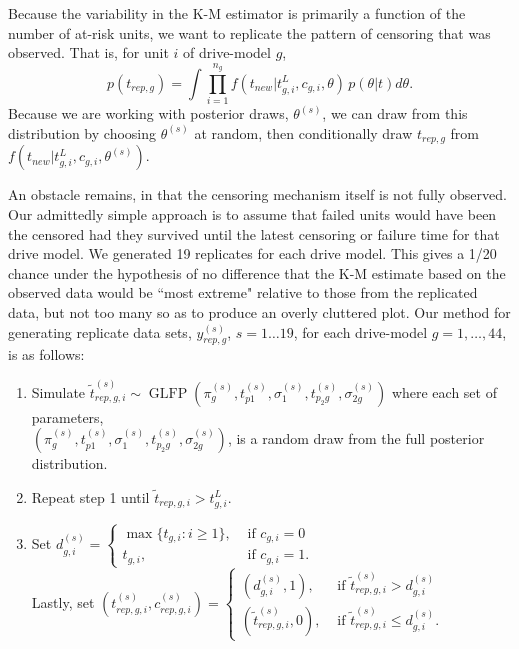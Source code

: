 \documentclass[aoas]{imsart}
\newcommand{\op}{\operatorname}
\begin{document}
Because the variability in the K-M estimator is primarily a function of the number of at-risk units, we want to replicate the pattern of censoring that was observed. That is, for unit $i$ of drive-model $g$,
$$p(t_{rep,g}) = \int \prod_{i=1}^{n_g}f(t_{new}|t_{g,i}^L,c_{g,i},\theta)\,p(\theta|t)d\theta.$$
Because we are working with posterior draws, $\theta^{(s)}$, we can draw from this distribution by choosing $\theta^{(s)}$ at random, then conditionally draw $t_{rep,g}$ from $f(t_{new}|t_{g,i}^L,c_{g,i},\theta^{(s)}).$

An obstacle remains, in that the censoring mechanism itself is not fully observed. Our admittedly simple approach is to assume that failed units would have been the censored had they survived until the latest censoring or failure time for that drive model. We generated 19 replicates for each drive model. This gives a 1/20 chance under the hypothesis of no difference that the K-M estimate based on the observed data would be ``most extreme" relative to those from the replicated data, but not too many so as to produce an overly cluttered plot. Our method for generating replicate data sets, $y_{rep,g}^{(s)}$, $s = 1 \dots 19$, for each drive-model $g=1,\ldots,44$, is as follows:
\begin{enumerate}
\item Simulate $\tilde{t}_{rep,g,i}^{(s)} \sim \op{GLFP}(\pi_{g}^{(s)},t_{p1}^{(s)},\sigma_1^{(s)},t_{p_{2}g}^{(s)}, \sigma_{2g}^{(s)})$ where each set of parameters, \\$\left( \pi_{g}^{(s)},t_{p1}^{(s)},\sigma_1^{(s)},t_{p_{2}g}^{(s)}, \sigma_{2g}^{(s)} \right)$, is a random draw from the full posterior distribution.
\item Repeat step 1 until $\tilde{t}_{rep,g,i} > t_{g,i}^L$.
\item Set $d_{g,i}^{(s)}= \begin{cases} \max \{t_{g,i}: i \ge 1\}, & \mbox{ if }c_{g,i}=0\\
t_{g,i}, & \mbox{ if }c_{g, i}=1. \end{cases}$\\
Lastly, set $(t_{rep,g,i}^{(s)},c_{rep,g,i}^{(s)}) = \begin{cases}
  (d_{g,i}^{(s)},1), & \mbox{ if } \tilde{t}_{rep,g,i}^{(s)}>d_{g,i}^{(s)}\\
  (\tilde{t}_{rep,g,i}^{(s)},0), & \mbox{ if }\tilde{t}_{rep,g,i}^{(s)} \le d_{g,i}^{(s)}.
\end{cases}$
\end{enumerate}
\end{document}
